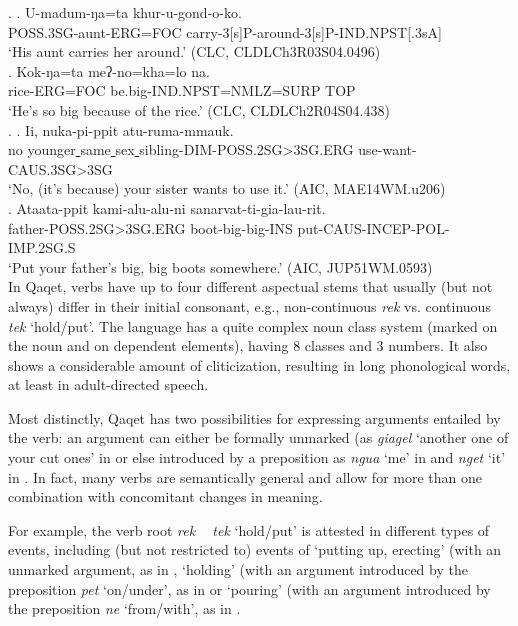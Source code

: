 \documentclass[a4paper, 11pt]{book}
\newcommand{\source}[1]{\hfill (#1)\\[-0.2cm]}	%
\newcommand{\und}{\underline{{ }}\hspace{0.2mm}}	%
\begin{document}
\ex.
	\ag. U-madum-ŋa=ta khur-u-gond-o-ko. \\
		POSS.3SG-aunt-ERG=FOC carry-3[s]P-around-3[s]P-IND.NPST[.3sA] \\
		‘His aunt carries her around.’ \source{CLC, CLDLCh3R03S04.0496}
	\bg. Kok-ŋa=ta meʔ-no=kha=lo na. \\
		rice-ERG=FOC be.big-IND.NPST=NMLZ=SURP TOP \\
		‘He’s so big because of the rice.’ \source{CLC, CLDLCh2R04S04.438}

\ex.
	\ag. Ii, nuka-pi-ppit atu-ruma-mmauk. \\
		no younger\und same\und sex\und sibling-DIM-POSS.2SG>3SG.ERG use-want-CAUS.3SG>3SG \\
		‘No, (it’s because) your sister wants to use it.’ \source{AIC, MAE14WM.u206}
	\bg. Ataata-ppit kami-alu-alu-ni sanarvat-ti-gia-lau-rit. \\
		father-POSS.2SG>3SG.ERG boot-big-big-INS put-CAUS-INCEP-POL-IMP.2SG.S \\
		‘Put your father’s big, big boots somewhere.’ \source{AIC, JUP51WM.0593}


In Qaqet, verbs have up to four different aspectual stems that usually (but not always) differ in their initial consonant, e.g., non-continuous \textit{rek} vs. continuous \textit{tek} ‘hold/put’. The language has a quite complex noun class system (marked on the noun and on dependent elements), having 8 classes and 3 numbers. It also shows a considerable amount of cliticization, resulting in long phonological words, at least in adult-directed speech.


Most distinctly, Qaqet has two possibilities for expressing arguments entailed by the verb:
an argument can either be formally unmarked (as \textit{giagel} ‘another one of your cut ones’ in \Next[a]
or else introduced by a preposition as \textit{ngua} ‘me’ in \Next[b] and \textit{nget} ‘it’ in \Next[c].
In fact, many verbs are semantically general and allow for more than one combination with concomitant changes in meaning.

For example, the verb root \textit{rek ~ tek} ‘hold/put’ is attested in different types of events, including (but not restricted to) events of ‘putting up, erecting’ (with an unmarked argument, as in \Next[a], ‘holding’ (with an argument introduced by the preposition \textit{pet} ‘on/under’, as in \Next[b] or ‘pouring’ (with an argument introduced by the preposition \textit{ne} ‘from/with’, as in \Next[c].
\end{document}
